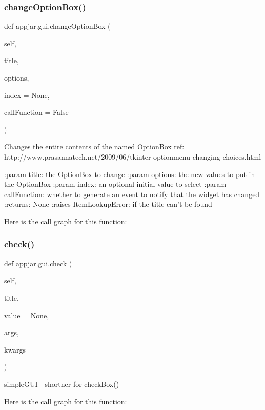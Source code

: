 \subsubsection{\texorpdfstring{change\+Option\+Box()}{changeOptionBox()}}
{\footnotesize\ttfamily def appjar.\+gui.\+change\+Option\+Box (\begin{DoxyParamCaption}\item[{}]{self,  }\item[{}]{title,  }\item[{}]{options,  }\item[{}]{index = {\ttfamily None},  }\item[{}]{call\+Function = {\ttfamily False} }\end{DoxyParamCaption})}

\begin{DoxyVerb}Changes the entire contents of the named OptionBox
ref: http://www.prasannatech.net/2009/06/tkinter-optionmenu-changing-choices.html

:param title: the OptionBox to change
:param options: the new values to put in the OptionBox
:param index: an optional initial value to select
:param callFunction: whether to generate an event to notify that the widget has changed
:returns: None
:raises ItemLookupError: if the title can't be found
\end{DoxyVerb}
 Here is the call graph for this function\+:
\mbox{\label{classappjar_1_1gui_a19ebba5d0f738981a6d3210a88d20dbc}} 
\subsubsection{\texorpdfstring{check()}{check()}}
{\footnotesize\ttfamily def appjar.\+gui.\+check (\begin{DoxyParamCaption}\item[{}]{self,  }\item[{}]{title,  }\item[{}]{value = {\ttfamily None},  }\item[{}]{args,  }\item[{}]{kwargs }\end{DoxyParamCaption})}

\begin{DoxyVerb}simpleGUI - shortner for checkBox() \end{DoxyVerb}
 Here is the call graph for this function\+:
\mbox{\label{classappjar_1_1gui_a88b585699e7e9d95175900d31961112d}} 
